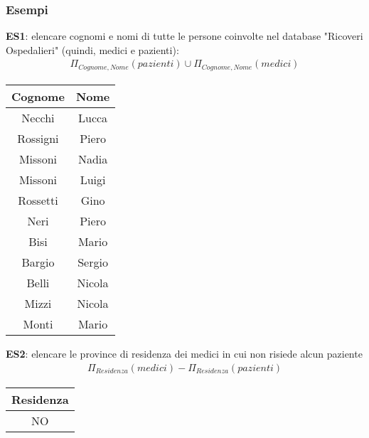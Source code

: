 \subsubsection{Esempi}
\textbf{ES1}: elencare cognomi e nomi di tutte le persone coinvolte nel database "Ricoveri Ospedalieri" (quindi, medici e pazienti):
    \begin{equation}\begin{aligned}
        \Pi_{Cognome, Nome} (pazienti) \cup
        \Pi_{Cognome, Nome} (medici)
    \end{aligned}\end{equation}
    \begin{center}\begin{tabular}{|c|c|}\hline
        \textbf{Cognome} & \textbf{Nome}\\ \hline
        Necchi & Lucca \\ \hline
        Rossigni & Piero\\ \hline
        Missoni & Nadia\\ \hline
        Missoni & Luigi\\ \hline 
        Rossetti & Gino\\ \hline
        Neri & Piero\\ \hline
        Bisi & Mario\\ \hline
        Bargio & Sergio\\ \hline
        Belli & Nicola\\ \hline
        Mizzi & Nicola\\ \hline
        Monti & Mario\\ \hline
    \end{tabular}\end{center}
\textbf{ES2}: elencare le province di residenza dei medici in cui non risiede alcun paziente
    \begin{equation}\begin{aligned}
        \Pi_{Residenza} (medici) -
        \Pi_{Residenza} (pazienti)
    \end{aligned}\end{equation}
    \begin{center}\begin{tabular}{|c|}\hline
        \textbf{Residenza} \\ \hline
        NO \\ \hline
    \end{tabular}\end{center}
    
